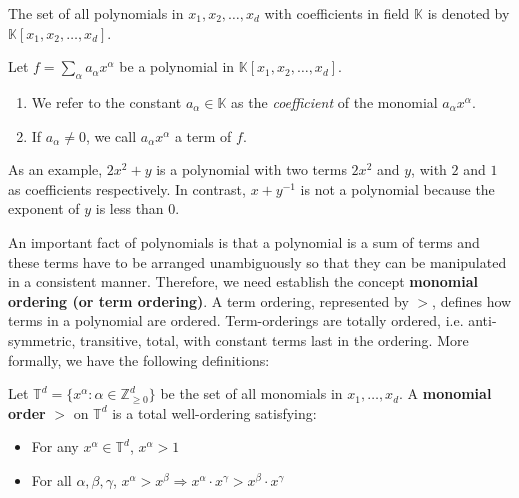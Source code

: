 The set of all polynomials in $x_1, x_2, \ldots, x_d$ with coefficients in field $\mathbb{K}$ 
is denoted by $\mathbb{K}[x_1, x_2, \ldots, x_d]$.


\begin{Definition}
Let $f=\sum_{\alpha} a_{\alpha} x^{\alpha}$ be a polynomial in $\mathbb{K}[x_1, x_2, \ldots, x_d]$. 
\begin{enumerate}
\item We refer to the constant $a_{\alpha} \in \mathbb{K}$ as the \textit{coefficient} of the monomial $a_{\alpha} x^{\alpha}$.
\item If $a_{\alpha} \neq 0$, we call $a_{\alpha} x^{\alpha}$ a term of $f$.
\end{enumerate}
\end{Definition}

As an example, $2x^2+y$ is a polynomial with two terms $2x^2$ and $y$, with $2$ and $1$ as coefficients respectively. 
In contrast, $x+y^{-1}$ is not a polynomial because the exponent of $y$ is less than $0$.

An important fact of polynomials is that a polynomial is a sum of terms and 
these terms have to be arranged unambiguously so that they can be manipulated in a consistent manner.
Therefore, we need establish the concept {\bf monomial ordering (or term ordering)}.
A term ordering, represented by $>$, defines how
terms in a polynomial are ordered.  Term-orderings are totally ordered,
i.e. anti-symmetric, transitive, total, with constant terms last in the ordering. 
More formally, we have the following definitions:
\begin{Definition}
Let $\mathbb{T}^{d}=\{x^{\alpha}: \alpha\in \mathbb{Z}_{\ge 0}^{d}\}$ be the set of all monomials in $x_{1},\dots,x_{d}$.
A {\bf monomial order} $>$ on $\mathbb{T}^{d}$ is a total well-ordering satisfying:
\begin{itemize}
	\item For any $x^{\alpha} \in \mathbb{T}^{d}$, $x^{\alpha}>1$
	\item For all $\alpha, \beta, \gamma$, $x^{\alpha}>x^{\beta} \Rightarrow x^{\alpha} \cdot x^{\gamma}> x^{\beta} \cdot x^{\gamma}$
\end{itemize}
\end{Definition}

